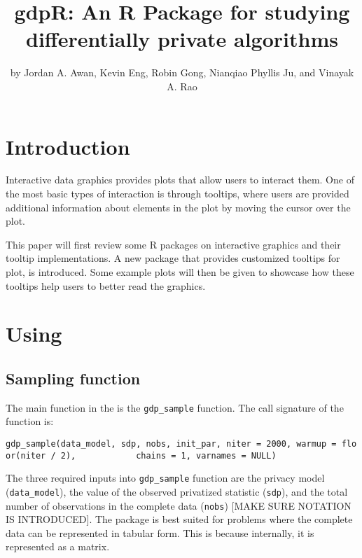 \title{gdpR: An R Package for studying differentially private algorithms}


\author{by Jordan A. Awan, Kevin Eng, Robin Gong, Nianqiao Phyllis Ju, and Vinayak A. Rao}

\maketitle


\hypertarget{introduction}{%
\section{Introduction}\label{introduction}}

Interactive data graphics provides plots that allow users to interact them. One of the most basic types of interaction is through tooltips, where users are provided additional information about elements in the plot by moving the cursor over the plot.

This paper will first review some R packages on interactive graphics and their tooltip implementations. A new package  that provides customized tooltips for plot, is introduced. Some example plots will then be given to showcase how these tooltips help users to better read the graphics.

\hypertarget{using}{%
\section{\texorpdfstring{Using }{Using }}\label{using}}

\hypertarget{sampling-function}{%
\subsection{Sampling function}\label{sampling-function}}

The main function in the  is the \texttt{gdp\_sample} function. The call
signature of the function is:

\texttt{gdp\_sample(data\_model,\ sdp,\ nobs,\ init\_par,\ niter\ =\ 2000,\ warmup\ =\ floor(niter\ /\ 2),\ \ \ \ \ \ \ \ \ \ \ \ chains\ =\ 1,\ varnames\ =\ NULL)}

The three required inputs into \texttt{gdp\_sample} function are the privacy model (\texttt{data\_model}), the value
of the observed privatized statistic (\texttt{sdp}), and the total number of observations
in the complete data (\texttt{nobs}) {[}MAKE SURE NOTATION IS INTRODUCED{]}. The 
package is best suited for problems where the complete data can be represented in
tabular form. This is because internally, it is represented as a matrix.

